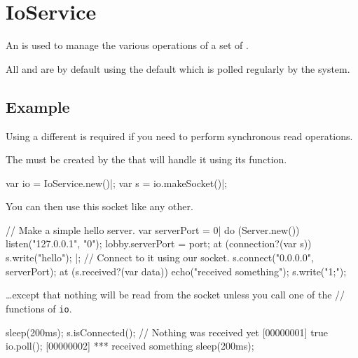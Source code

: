
\section{IoService}

An  is used to manage the various operations of a set of
.

All  and  are by default using the
default  which is polled regularly by the system.

\subsection{Example}

Using a different  is required if you need to perform
synchronous read operations.

The  must be created by the  that
will handle it using its  function.

\begin{urbiscript}
var io = IoService.new()|;
var s = io.makeSocket()|;
\end{urbiscript}

You can then use this socket like any other.

\begin{urbiscript}
// Make a simple hello server.
var serverPort = 0|
do (Server.new())
{
  listen("127.0.0.1", "0");
  lobby.serverPort = port;
  at (connection?(var s))
  {
    s.write("hello");
  }
}|;
// Connect to it using our socket.
s.connect("0.0.0.0", serverPort);
at (s.received?(var data))
  echo("received something");
s.write("1;");
\end{urbiscript}

\noindent
\ldots except that nothing will be read from the socket unless you call one
of the // functions of
\lstinline|io|.

\begin{urbiscript}
sleep(200ms);
s.isConnected(); // Nothing was received yet
[00000001] true
io.poll();
[00000002] *** received something
sleep(200ms);
\end{urbiscript}

